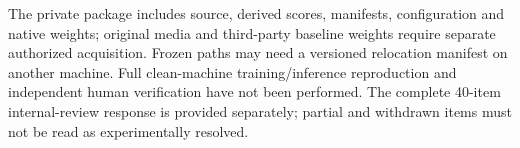 The private package includes source, derived scores, manifests, configuration
and native weights; original media and third-party baseline weights require
separate authorized acquisition. Frozen paths may need a versioned relocation
manifest on another machine. Full clean-machine training/inference reproduction
and independent human verification have not been performed. The complete
40-item internal-review response is provided separately; partial and withdrawn
items must not be read as experimentally resolved.
